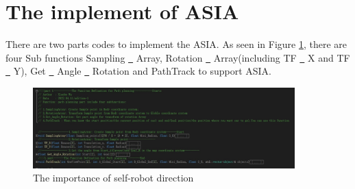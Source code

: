 \section{The implement of ASIA}

There are two parts codes to implement the ASIA. As seen in Figure \ref{part12}, there are four Sub functions Sampling \underline{~} Array, Rotation \underline{~} Array(including TF \underline{~} X and TF \underline{~} Y), Get \underline{~} Angle \underline{~} Rotation and PathTrack to support ASIA. 

\begin{figure}[htbp]
	\centering
	\includegraphics[width =0.9\textwidth]{images/part1.png}

	\caption{The importance of self-robot direction}\label{part12}
\end{figure}


